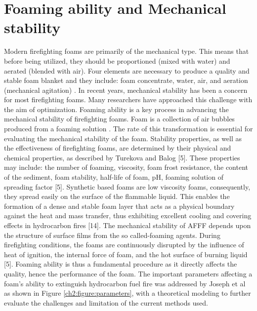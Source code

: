 \documentclass[12pt]{report}
\begin{document}
\section{Foaming ability and Mechanical stability}
Modern firefighting foams are primarily of the mechanical type. This means that before being utilized, they should be proportioned (mixed with water) and aerated (blended with air). Four elements are necessary to produce a quality and stable foam blanket and they include: foam concentrate, water, air, and aeration (mechanical agitation) \cite{oguike2013study}.
In recent years, mechanical stability has been a concern for most firefighting foams. Many researchers have approached this challenge with the aim of optimization. Foaming ability is a key process in advancing the mechanical stability of firefighting foams. Foam is a collection of air bubbles produced from a foaming solution \cite{oguike2013study}. The rate of this transformation is essential for evaluating the mechanical stability of the foam. Stability properties, as well as the effectiveness of firefighting foams, are determined by their physical and chemical properties, as described by Turekova and Balog [5]. These properties may include: the number of foaming, viscosity, foam frost resistance, the content of the sediment, foam stability, half-life of foam, pH, foaming solution of spreading factor [5].
Synthetic based foams are low viscosity foams, consequently, they spread easily on the surface of the flammable liquid. This enables the formation of a dense and stable foam layer that acts as a physical boundary against the heat and mass transfer, thus exhibiting excellent cooling and covering effects in hydrocarbon fires [14]. The mechanical stability of AFFF depends upon the structure of surface films from the so called-foaming agents. During firefighting conditions, the foams are continuously disrupted by the influence of heat of ignition, the internal force of foam, and the hot surface of burning liquid [5]. Foaming ability is thus a fundamental procedure as it directly affects the quality, hence the performance of the foam. The important parameters affecting a foam's ability to extinguish hydrocarbon fuel fire was addressed by Joseph et al \cite{scheffey1995evaluating} as shown in Figure \ref{ch2:figure:parameters}, with a theoretical modeling to further evaluate the challenges and limitation of the current methods used. 
\end{document}

